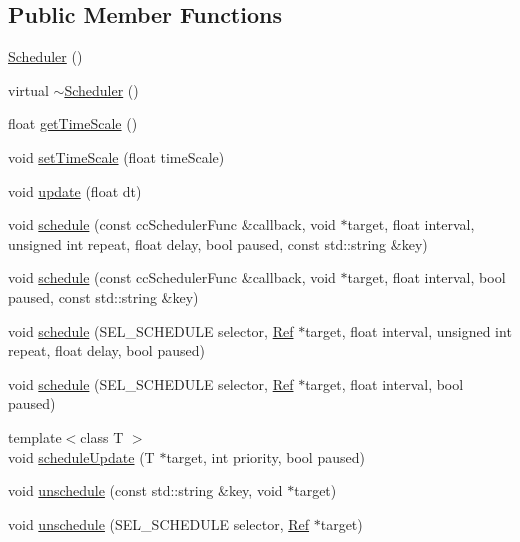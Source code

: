 \subsection*{Public Member Functions}
\begin{DoxyCompactItemize}
\item 
\hyperlink{classScheduler_a3b61aac11466cd45ae42ab8c2b0013f6}{Scheduler} ()
\item 
virtual \hyperlink{classScheduler_afc8187779b46f64039d3ffa58f0dbe51}{$\sim$\+Scheduler} ()
\item 
float \hyperlink{classScheduler_a2ec13a52fa6a75450f17f122444069a9}{get\+Time\+Scale} ()
\item 
void \hyperlink{classScheduler_a7aeaef587604d3a1f20ebac7a12b1d77}{set\+Time\+Scale} (float time\+Scale)
\item 
void \hyperlink{classScheduler_a533ad6047192a10444e2f4d386f3766a}{update} (float dt)
\item 
void \hyperlink{classScheduler_a0d52145629a67e888cf1b25fd01f668b}{schedule} (const cc\+Scheduler\+Func \&callback, void $\ast$target, float interval, unsigned int repeat, float delay, bool paused, const std\+::string \&key)
\item 
void \hyperlink{classScheduler_a895a2f8f8eb3fc23b869cd1221660dcd}{schedule} (const cc\+Scheduler\+Func \&callback, void $\ast$target, float interval, bool paused, const std\+::string \&key)
\item 
void \hyperlink{classScheduler_a5d34a2cf35f2af15f3377ee8b2e88a38}{schedule} (S\+E\+L\+\_\+\+S\+C\+H\+E\+D\+U\+LE selector, \hyperlink{classRef}{Ref} $\ast$target, float interval, unsigned int repeat, float delay, bool paused)
\item 
void \hyperlink{classScheduler_aef7946e2043d6e49f2a0a460740d8ae5}{schedule} (S\+E\+L\+\_\+\+S\+C\+H\+E\+D\+U\+LE selector, \hyperlink{classRef}{Ref} $\ast$target, float interval, bool paused)
\item 
{\footnotesize template$<$class T $>$ }\\void \hyperlink{classScheduler_ad566d55a4941459c185e6faeddc3a70f}{schedule\+Update} (T $\ast$target, int priority, bool paused)
\item 
void \hyperlink{classScheduler_a3ca194b9ca146d9c522cc2c54a6d4ede}{unschedule} (const std\+::string \&key, void $\ast$target)
\item 
void \hyperlink{classScheduler_a6d354b587d5f12df2e6094116fd65c71}{unschedule} (S\+E\+L\+\_\+\+S\+C\+H\+E\+D\+U\+LE selector, \hyperlink{classRef}{Ref} $\ast$target)

\end{DoxyCompactItemize}
